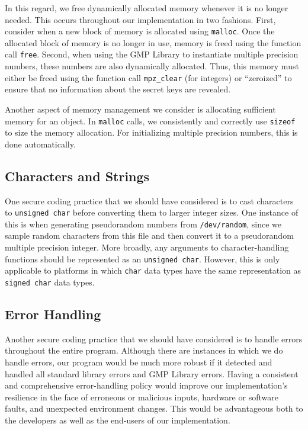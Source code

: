 \documentclass[a4paper]{article}
\begin{document}
In this regard, we free dynamically allocated memory whenever it is no longer needed. This occurs throughout our implementation in two fashions. First, consider when a new block of memory is allocated using {\tt malloc}. Once the allocated block of memory is no longer in use, memory is freed using the function call {\tt free}. Second, when using the GMP Library to instantiate multiple precision numbers, these numbers are also dynamically allocated. Thus, this memory must
either be freed using the function call {\tt mpz\_clear} (for integers) or ``zeroized'' to ensure that no information about the secret keys are revealed.

Another aspect of memory management we consider is allocating sufficient memory for an object. In {\tt malloc} calls, we consistently and correctly use {\tt sizeof} to size the memory allocation. For initializing multiple precision numbers, this is done automatically. 

\subsection{Characters and Strings}

One secure coding practice that we should have considered is to cast characters to {\tt unsigned char} before converting them to larger integer sizes. One instance of this is when generating pseudorandom numbers from {\tt /dev/random}, since we sample random characters from this file and then convert it to a pseudorandom multiple precision integer. More broadly, any arguments to character-handling functions should be represented as an {\tt unsigned char}.
However, this is only applicable to platforms in which {\tt char} data types have the same representation as {\tt signed char} data types.

\subsection{Error Handling}

Another secure coding practice that we should have considered is to handle errors throughout the entire program. Although there are instances in which we do handle errors, our program would be much more robust if it detected and handled all standard library errors and GMP Library errors. Having a consistent and comprehensive error-handling policy would improve our implementation's resilience in the face of erroneous or malicious inputs, hardware or software faults, and
unexpected environment changes. This would be advantageous both to the developers as well as the end-users of our implementation.
\end{document}
